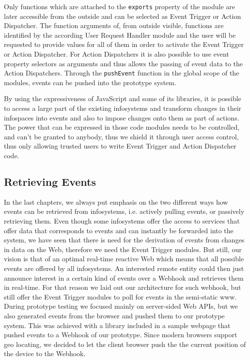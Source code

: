 Only functions which are attached to the \texttt{exports} property of the module are later accessible from the outside and can be selected as \textrm{Event Trigger} or \textrm{Action Dispatcher}.
The function arguments of, from outside visible, functions are identified by the according \textrm{User Request Handler} module and the user will be requested to provide values for all of them in order to activate the \textrm{Event Trigger} or \textrm{Action Dispatcher}.
For \textrm{Action Dispatchers} it is also possible to use event property selectors as arguments and thus allows the passing of event data to the \textrm{Action Dispatchers}.
Through the \texttt{pushEvent} function in the global scope of the modules, events can be pushed into the prototype system.

By using the expressiveness of \textrm{JavaScript} and some of its libraries, it is possible to access a large part of the existing \textrm{\glspl{infosystem}} and transform changes in their \textrm{\glspl{infospace}} into events and also to impose changes onto them as part of actions.
The power that can be expressed in those code modules needs to be controlled, and can't be granted to anybody, thus we shield it through user access control, thus only allowing trusted users to write \textrm{Event Trigger} and \textrm{Action Dispatcher} code.



\subsection{Retrieving Events}
In the last chapters, we always put emphasis on the two different ways how events can be retrieved from \textrm{\glspl{infosystem}}, i.e. actively pulling events, or passively retrieving them.
Even though some \textrm{\glspl{infosystem}} offer the access to services that offer data that corresponds to events and can instantly be forwarded into the system, we have seen that there is need for the derivation of events from changes in data on the Web, therefore we need the \textrm{Event Trigger} modules.
But still, our vision is that of an optimal real-time reactive Web which means that all possible events are offered by all \textrm{\glspl{infosystem}}.
An interested remote entity could then just announce interest in a certain kind of events over a \textrm{Webhook} and retrieves them in real-time.
For that reason we laid out our architecture for such \textrm{\gls{webhook}}, but still offer the \textrm{Event Trigger} modules to poll for events in the semi-static \textrm{\gls{www}}.
During prototype testing we focused mainly on server-sided \textrm{Web APIs}, but we also generated events from the browser and pushed them to our prototype system.
This was achieved with a library included in a sample webpage that pushed events to a \textrm{Webhook} of our prototype.
Since modern browsers support geo locating, we decided to let the client browser push the the current position of the device to the \textrm{Webhook}.



